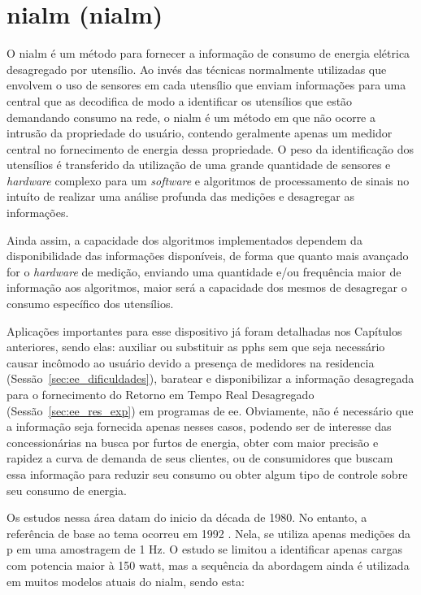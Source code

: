 \chapter[NIALM]{\acrlong{nialm} (\acrshort{nialm})}
\label{cap:nialm}


O \gls{nialm} é um método para fornecer a informação de consumo de energia
elétrica desagregado por utensílio. Ao invés das técnicas normalmente utilizadas
que envolvem o uso de sensores em cada utensílio que enviam informações para uma
central que as decodifica de modo a identificar os utensílios que estão
demandando consumo na rede, o \gls{nialm} é um método em que não ocorre a
intrusão da propriedade do usuário, contendo geralmente apenas um medidor central no
fornecimento de energia dessa propriedade. O peso da identificação dos utensílios
é transferido da utilização de uma grande quantidade de sensores e
\emph{hardware} complexo para um \emph{software} e algoritmos de processamento
de sinais no intuíto de realizar uma análise profunda das medições e desagregar
as informações.

Ainda assim, a capacidade dos algoritmos implementados dependem da
disponibilidade das informações disponíveis, de forma que quanto mais avançado
for o \emph{hardware} de medição, enviando uma quantidade e/ou frequência maior de 
informação aos algoritmos, maior será a capacidade dos mesmos de desagregar o
consumo específico dos utensílios.

Aplicações importantes para esse dispositivo já foram detalhadas nos Capítulos
anteriores, sendo elas: auxiliar ou substituir as \glspl{pph} sem que seja
necessário causar incômodo ao usuário devido a presença de medidores na
residencia (Sessão~\ref{sec:ee_dificuldades}), baratear e disponibilizar a informação 
desagregada para o fornecimento do Retorno em Tempo Real Desagregado
(Sessão~\ref{sec:ee_res_exp}) em programas de \gls{ee}. Obviamente, não é
necessário que a informação seja fornecida apenas nesses casos, podendo ser de
interesse das concessionárias na busca por furtos de energia, obter com maior
precisão e rapidez a curva de demanda de seus clientes, ou de consumidores
que buscam essa informação para reduzir seu consumo ou obter algum tipo de
controle sobre seu consumo de energia.

Os estudos nessa área datam do inicio da década de 1980. No entanto, a
referência de base ao tema ocorreu em 1992 \cite{nilm_hart}. Nela, se
utiliza apenas medições da \gls{p} em uma amostragem de 1 Hz. O estudo se
limitou a identificar apenas cargas com potencia maior à 150
\acrshort{watt}, mas a sequência da abordagem ainda é utilizada em muitos modelos 
atuais do \gls{nialm}, sendo esta: 

